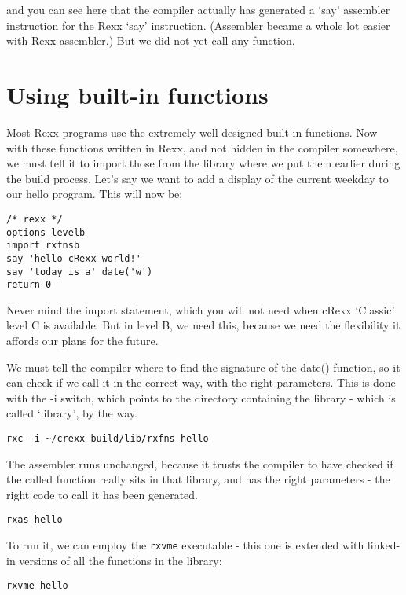 and you can see here that the compiler actually has generated a `say'
assembler instruction for the Rexx `say' instruction. (Assembler became
a whole lot easier with Rexx assembler.) But we did not yet call any
function.

\hypertarget{using-built-in-functions}{%
\section{Using built-in functions}\label{using-built-in-functions}}

Most Rexx programs use the extremely well designed built-in functions.
Now with these functions written in Rexx, and not hidden in the compiler
somewhere, we must tell it to import those from the library where we put
them earlier during the build process. Let's say we want to add a
display of the current weekday to our hello program. This will now be:

\begin{verbatim}
/* rexx */
options levelb
import rxfnsb
say 'hello cRexx world!'
say 'today is a' date('w')
return 0
\end{verbatim}

Never mind the import statement, which you will not need when cRexx
`Classic' level C is available. But in level B, we need this, because we
need the flexibility it affords our plans for the future.

We must tell the compiler where to find the signature of the date()
function, so it can check if we call it in the correct way, with the
right parameters. This is done with the -i switch, which points to the
directory containing the library - which is called `library', by the
way.

\begin{verbatim}
rxc -i ~/crexx-build/lib/rxfns hello
\end{verbatim}

The assembler runs unchanged, because it trusts the compiler to have
checked if the called function really sits in that library, and has the
right parameters - the right code to call it has been generated.

\begin{verbatim}
rxas hello
\end{verbatim}

To run it, we can employ the \texttt{rxvme} executable - this one is
extended with linked-in versions of all the functions in the library:

\begin{verbatim}
rxvme hello
\end{verbatim}

